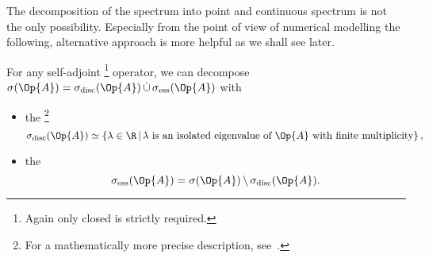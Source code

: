 The decomposition of the spectrum into point and continuous spectrum
is not the only possibility.
Especially from the point of view of numerical modelling
the following, alternative approach is more helpful
as we shall see later.

\begin{defn}
	For any self-adjoint%
	\footnote{Again only closed is strictly required.}
	operator,
	we can decompose \linebreak
	$\sigma(\Op{A}) = \sigma_\text{disc}(\Op{A}) \, \dot{\cup} \, \sigma_\text{ess}(\Op{A})$
	with
	\begin{itemize}
		\item the %
			\footnote{For a mathematically more precise description, see~\cite[p.~103 and p.~132]{Helffer2013}.}
			\[ \sigma_\text{disc}(\Op{A}) \simeq \left\{ \lambda \in \R \, \middle|
			\, \text{$\lambda$ is an isolated eigenvalue of $\Op{A}$
			with finite multiplicity} \right\}, \]
		\item the 
			\[\sigma_\text{ess}(\Op{A}) 
			= \sigma(\Op{A}) \, \backslash \, \sigma_\text{disc}(\Op{A}). \]
	\end{itemize}
\end{defn}

